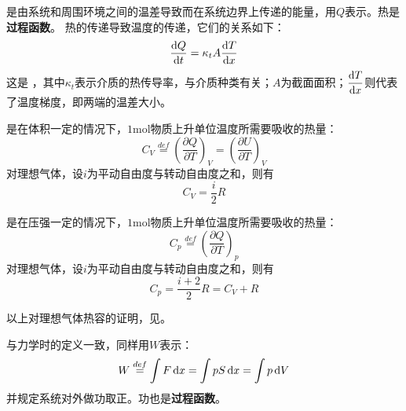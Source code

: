            \begin{Itemize}
                \item {}是由系统和周围环境之间的温差导致而在系统边界上传递的能量，用$Q$表示。热是\textbf{过程函数}。
                热的传递导致温度的传递，它们的关系如下：
                \begin{equation}
                    \frac{\dif{Q}}{\dif{t}} = \kappa_{t}A\frac{\dif{T}}{\dif{x}}
                \end{equation}
                这是 ，其中$\kappa_{t}$表示介质的热传导率，与介质种类有关；$A$为截面面积；$\dfrac{\dif{T}}{\dif{x}}$则代表了温度梯度，即两端的温差大小。
                \item {} 是在体积一定的情况下，$1\mathrm{mol}$物质上升单位温度所需要吸收的热量：
                \begin{equation}
                    C_{V} \overset{def}{=} \left(\frac{\partial{Q}}{\partial{T}}\right)_{V} = \left(\frac{\partial{U}}{\partial{T}}\right)_{V}
                    \nonumber
                \end{equation}
                对理想气体，设$i$为平动自由度与转动自由度之和，则有
                \begin{equation}
                    C_{V} = \frac{i}{2}R
                    \nonumber
                \end{equation}
                \item {} 是在压强一定的情况下，$1\mathrm{mol}$物质上升单位温度所需要吸收的热量：
                \begin{equation}
                    C_{p} \overset{def}{=} \left(\frac{\partial{Q}}{\partial{T}}\right)_{p} 
                    \nonumber
                \end{equation}
                对理想气体，设$i$为平动自由度与转动自由度之和，则有
                \begin{equation}
                    C_{p} = \frac{i+2}{2}R = C_{V}+R
                    \nonumber
                \end{equation}
                
                以上对理想气体热容的证明，见。
                \item {} 与力学时的定义一致，同样用$W$表示：
                \begin{equation}
                    W \overset{def}{=} \int F\dif{x} = \int pS\dif{x} = \int p\dif{V}
                    \nonumber
                \end{equation}
                并规定系统对外做功取正。功也是\textbf{过程函数}。                
            \end{Itemize}

